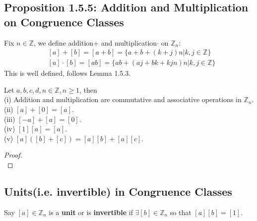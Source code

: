 \documentclass[11pt]{elegantbook}
\begin{document}
\subsection{Proposition 1.5.5: Addition and Multiplication on Congruence Classes}
Fix $n\in\mathbb{Z}$, we define addition$+$ and multiplication$\cdot$ on $\mathbb{Z}_n$:
\begin{equation}
    \begin{aligned}
        &[a]+[b]=[a+b]=\{a+b+(k+j)n|k,j\in\mathbb{Z}\}\\
        &[a]\cdot [b]=[ab]=\{ab+(aj+bk+kjn)n|k,j\in\mathbb{Z} \}
    \end{aligned}
    \nonumber
\end{equation}
This is well defined, follows Lemma 1.5.3.
\begin{proposition}[Proposition 1.5.5.]
    Let $a,b,c,d,n\in\mathbb{Z}, n\geq 1$, then\\
    (i) Addition and multiplication are commutative and associative operations in $\mathbb{Z}_n$.\\
    (ii) $[a] + [0] = [a]$.\\(iii) $[-a] + [a] = [0]$.\\(iv) $[1][a] = [a]$.\\(v) $[a]([b] + [c]) = [a][b] + [a][c]$.
\end{proposition}
\begin{proof}
\quad\\

\end{proof}
\subsection{Units(i.e. invertible) in Congruence Classes}
Say $[a] \in \mathbb{Z}_n$ is a \textbf{unit} or is \textbf{invertible} if $\exists [b] \in \mathbb{Z}_n$ so that $[a][b] = [1]$.
\end{document}
